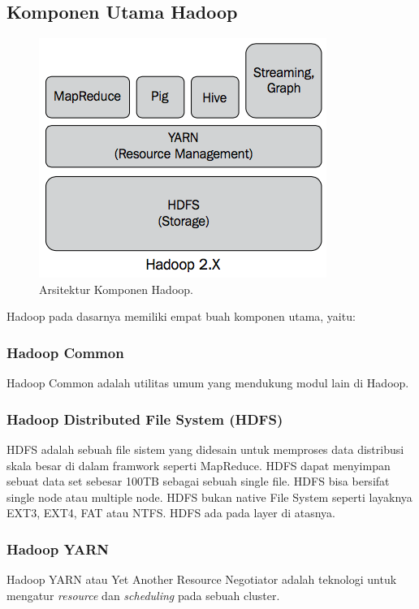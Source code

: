 \subsection{Komponen Utama Hadoop}
\label{sec:komponen_utama_hadoop}
\begin{figure}
	\centering
	\includegraphics[scale=0.5]{Gambar/hadoop-architecture.png}
	\caption[Arsitektur Komponen Hadoop]{Arsitektur Komponen Hadoop.\cite{karanth2014mastering}} 
\end{figure}

Hadoop pada dasarnya memiliki empat buah komponen utama, yaitu:
\subsubsection{Hadoop Common}
Hadoop Common adalah utilitas umum yang mendukung modul lain di Hadoop.

\subsubsection{Hadoop Distributed File System (HDFS)}
HDFS adalah sebuah file sistem yang didesain untuk memproses data distribusi skala besar di dalam framwork seperti MapReduce. HDFS dapat menyimpan sebuat data set sebesar 100TB sebagai sebuah single file.\cite{Lam:2010:HA:1965594} HDFS bisa bersifat single node atau multiple node. HDFS bukan native File System seperti layaknya EXT3, EXT4, FAT atau NTFS. HDFS ada pada layer di atasnya.
	
\subsubsection{Hadoop YARN}
Hadoop YARN atau Yet Another Resource Negotiator adalah teknologi untuk mengatur \textit{resource} dan \textit{scheduling} pada sebuah cluster.
	
